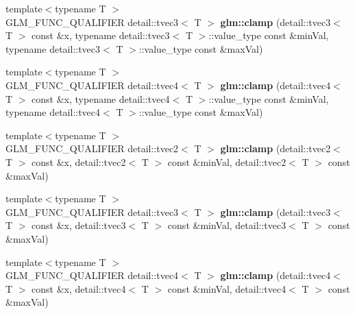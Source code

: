 \begin{DoxyCompactItemize}
\item 
\hypertarget{namespaceglm_a0cdcc0c9b89c686f79b390966be9457e}{{\footnotesize template$<$typename T $>$ }\\\-G\-L\-M\-\_\-\-F\-U\-N\-C\-\_\-\-Q\-U\-A\-L\-I\-F\-I\-E\-R \*
detail\-::tvec3$<$ \-T $>$ {\bfseries glm\-::clamp} (detail\-::tvec3$<$ \-T $>$ const \&x, typename detail\-::tvec3$<$ \-T $>$\-::value\-\_\-type const \&min\-Val, typename detail\-::tvec3$<$ \-T $>$\-::value\-\_\-type const \&max\-Val)}\label{namespaceglm_a0cdcc0c9b89c686f79b390966be9457e}

\item 
\hypertarget{namespaceglm_aa132b5ea030fc61f5e542937502e9c88}{{\footnotesize template$<$typename T $>$ }\\\-G\-L\-M\-\_\-\-F\-U\-N\-C\-\_\-\-Q\-U\-A\-L\-I\-F\-I\-E\-R \*
detail\-::tvec4$<$ \-T $>$ {\bfseries glm\-::clamp} (detail\-::tvec4$<$ \-T $>$ const \&x, typename detail\-::tvec4$<$ \-T $>$\-::value\-\_\-type const \&min\-Val, typename detail\-::tvec4$<$ \-T $>$\-::value\-\_\-type const \&max\-Val)}\label{namespaceglm_aa132b5ea030fc61f5e542937502e9c88}

\item 
\hypertarget{namespaceglm_a84f36f5b2d64937b9e5d6c7ea5a9af6c}{{\footnotesize template$<$typename T $>$ }\\\-G\-L\-M\-\_\-\-F\-U\-N\-C\-\_\-\-Q\-U\-A\-L\-I\-F\-I\-E\-R \*
detail\-::tvec2$<$ \-T $>$ {\bfseries glm\-::clamp} (detail\-::tvec2$<$ \-T $>$ const \&x, detail\-::tvec2$<$ \-T $>$ const \&min\-Val, detail\-::tvec2$<$ \-T $>$ const \&max\-Val)}\label{namespaceglm_a84f36f5b2d64937b9e5d6c7ea5a9af6c}

\item 
\hypertarget{namespaceglm_ac1c86927b7c877d85620e44926fd663c}{{\footnotesize template$<$typename T $>$ }\\\-G\-L\-M\-\_\-\-F\-U\-N\-C\-\_\-\-Q\-U\-A\-L\-I\-F\-I\-E\-R \*
detail\-::tvec3$<$ \-T $>$ {\bfseries glm\-::clamp} (detail\-::tvec3$<$ \-T $>$ const \&x, detail\-::tvec3$<$ \-T $>$ const \&min\-Val, detail\-::tvec3$<$ \-T $>$ const \&max\-Val)}\label{namespaceglm_ac1c86927b7c877d85620e44926fd663c}

\item 
\hypertarget{namespaceglm_af6385a855dccba450f5ed4090e592243}{{\footnotesize template$<$typename T $>$ }\\\-G\-L\-M\-\_\-\-F\-U\-N\-C\-\_\-\-Q\-U\-A\-L\-I\-F\-I\-E\-R \*
detail\-::tvec4$<$ \-T $>$ {\bfseries glm\-::clamp} (detail\-::tvec4$<$ \-T $>$ const \&x, detail\-::tvec4$<$ \-T $>$ const \&min\-Val, detail\-::tvec4$<$ \-T $>$ const \&max\-Val)}\label{namespaceglm_af6385a855dccba450f5ed4090e592243}


\end{DoxyCompactItemize}
